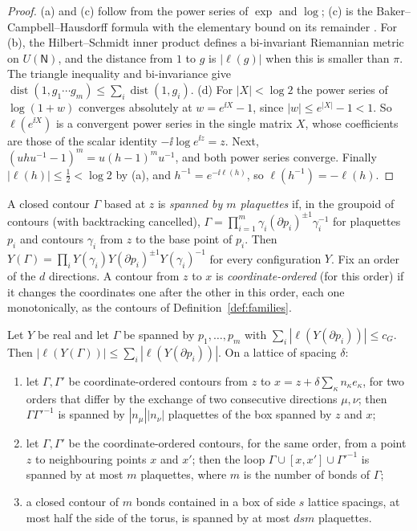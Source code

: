 \begin{proof}
(a) and (c) follow from the power series of $\exp$ and $\log$; (c) is the Baker--Campbell--Hausdorff formula with the elementary bound on its remainder \cite[(30)]{BalAvg}. For (b), the Hilbert--Schmidt inner product defines a bi-invariant Riemannian metric on $U(\mathsf N)$, and the distance from $1$ to $g$ is $|\ell(g)|$ when this is smaller than $\pi$. The triangle inequality and bi-invariance give $\operatorname{dist}(1,g_1\cdots g_m)\le\sum_i\operatorname{dist}(1,g_i)$. (d) For $|X|<\log2$ the power series of $\log(1+w)$ converges absolutely at $w=e^{\ii X}-1$, since $|w|\le e^{|X|}-1<1$. So $\ell(e^{\ii X})$ is a convergent power series in the single matrix $X$, whose coefficients are those of the scalar identity $-\ii\log e^{\ii z}=z$. Next, $(uhu^{-1}-1)^m=u(h-1)^mu^{-1}$, and both power series converge. Finally $|\ell(h)|\le\frac12<\log2$ by (a), and $h^{-1}=e^{-\ii\ell(h)}$, so $\ell(h^{-1})=-\ell(h)$.
\end{proof}

A closed contour $\Gamma$ based at $z$ is \emph{spanned by $m$ plaquettes} if, in the groupoid of contours (with backtracking cancelled), $\Gamma=\prod_{i=1}^m\gamma_i(\partial p_i)^{\pm1}\gamma_i^{-1}$ for plaquettes $p_i$ and contours $\gamma_i$ from $z$ to the base point of $p_i$. Then $Y(\Gamma)=\prod_iY(\gamma_i)Y(\partial p_i)^{\pm1}Y(\gamma_i)^{-1}$ for every configuration $Y$. Fix an order of the $d$ directions. A contour from $z$ to $x$ is \emph{coordinate-ordered} (for this order) if it changes the coordinates one after the other in this order, each one monotonically, as the contours of Definition~\ref{def:families}.

\begin{lemma}\label{lem:stokes}
Let $Y$ be real and let $\Gamma$ be spanned by $p_1,\dots,p_m$ with $\sum_i|\ell(Y(\partial p_i))|\le c_G$. Then $|\ell(Y(\Gamma))|\le\sum_i|\ell(Y(\partial p_i))|$. On a lattice of spacing $\delta$:
\begin{enumerate}[label=(\roman*)]
\item let $\Gamma,\Gamma'$ be coordinate-ordered contours from $z$ to $x=z+\delta\sum_\kappa n_\kappa e_\kappa$, for two orders that differ by the exchange of two consecutive directions $\mu,\nu$; then $\Gamma\Gamma'^{-1}$ is spanned by $|n_\mu||n_\nu|$ plaquettes of the box spanned by $z$ and $x$;
\item let $\Gamma,\Gamma'$ be the coordinate-ordered contours, for the same order, from a point $z$ to neighbouring points $x$ and $x'$; then the loop $\Gamma\cup[x,x']\cup\Gamma'^{-1}$ is spanned by at most $m$ plaquettes, where $m$ is the number of bonds of $\Gamma$;
\item a closed contour of $m$ bonds contained in a box of side $s$ lattice spacings, at most half the side of the torus, is spanned by at most $dsm$ plaquettes.
\end{enumerate}
\end{lemma}

